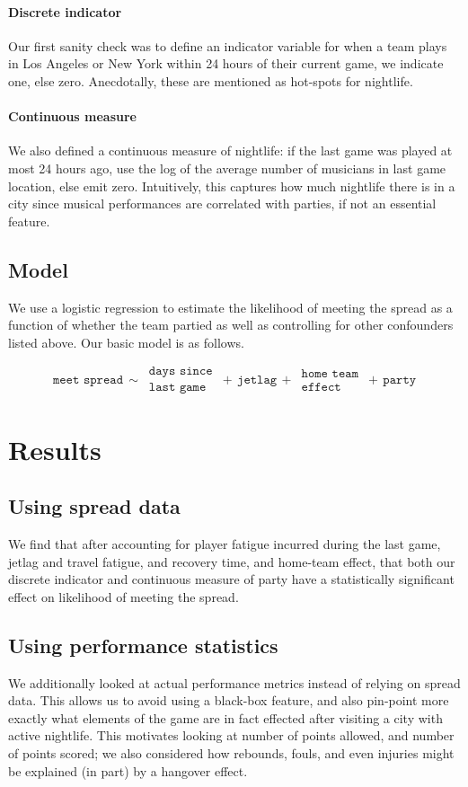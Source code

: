 \documentclass[letterpaper,12pt]{article}
\begin{document}
\paragraph{Discrete indicator}
Our first sanity check was to define an indicator variable for when a team plays in 
Los Angeles or New York within 24 hours of their current game, we indicate one, else zero. Anecdotally, these are mentioned as hot-spots for
nightlife.

\paragraph{Continuous measure}
We also defined a continuous measure of nightlife:
if the last game was played at most 24 hours ago, use the log of the average number
of musicians in last game location, else emit zero. Intuitively, this captures
how much nightlife there is in a city since musical performances are correlated
with parties, if not an essential feature.

\subsection{Model} We use a logistic regression to estimate the likelihood of meeting
the spread as a function of whether the team partied as well as controlling for other confounders
listed above. Our basic model is as follows.

\[
\texttt{meet spread} \,  \sim \, \substack{\texttt{days since} \\ \texttt{last game}} \, + \, \texttt{jetlag} \, + \, \substack{\texttt{home team} \\ \texttt{effect}} \, + \, \texttt{party}
\]

\section{Results}
\subsection{Using spread data}
We find that after accounting for player fatigue incurred during the last game, jetlag and travel fatigue, and recovery time, and home-team effect, that both our discrete indicator and continuous measure of party
have a statistically significant effect on likelihood of meeting the spread.


\subsection{Using performance statistics}
We additionally looked at actual performance metrics instead of relying on spread data. 
This allows us to avoid using a black-box feature, and also pin-point
more exactly what elements of the game are in fact effected after visiting a city with active 
nightlife. This motivates looking at number of points allowed, and number of points scored;
we also considered how rebounds, fouls, and even injuries might be explained (in part) by
a hangover effect.
\end{document}

